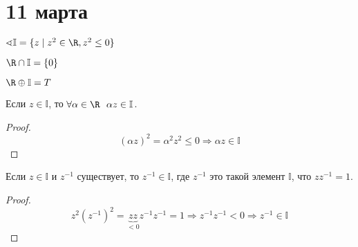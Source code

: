 \chapter{11 марта}

\(\sphericalangle \mathbb{I} = \{z \mid z^2 \in \R, z^2 \leq 0\}\)

\begin{remark}
	\(\R \cap \mathbb{I} = \{0\}\)
\end{remark}

\begin{theorem}
	\(\R \oplus \mathbb{I} = T\)
\end{theorem}

\begin{lemma}
	Если \(z \in \mathbb{I}\), то \(\forall \alpha \in \R \ \ \alpha z \in \mathbb{I}\).
\end{lemma}
\begin{proof}
	\[(\alpha z)^2 = \alpha^2 z^2 \leq 0 \Rightarrow \alpha z \in \mathbb{I}\]
\end{proof}

\begin{lemma}
	Если \(z \in \mathbb{I}\) и \(z^{-1}\) существует, то \(z^{-1} \in \mathbb{I}\), где \(z^{-1}\) это такой элемент \(\mathbb{I}\), что \(zz^{-1} = 1\).
\end{lemma}
\begin{proof}
	\[z^2 (z^{-1})^2 = \underbrace{zz}_{< 0} z^{-1}z^{-1} = 1 \Rightarrow z^{-1}z^{-1} < 0 \Rightarrow z^{-1} \in \mathbb{I}\]
\end{proof}


